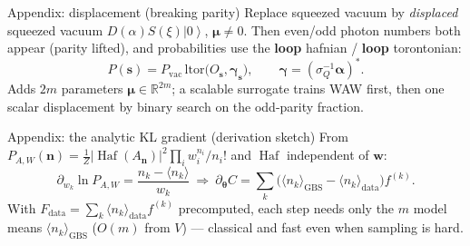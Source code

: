 \documentclass[10pt,aspectratio=169]{beamer}
\providecommand{\ket}[1]{\left|#1\right\rangle}
\newcommand{\Haf}{\operatorname{Haf}}
\newcommand{\vs}{\mathbf{s}}
\newcommand{\vn}{\mathbf{n}}
\begin{document}
\begin{frame}{Appendix: displacement (breaking parity)}
Replace squeezed vacuum by \emph{displaced} squeezed vacuum $D(\alpha)S(\xi)\ket0$,
$\bm\mu\neq0$. Then even/odd photon numbers both appear (parity lifted), and
probabilities use the \textbf{loop} hafnian / \textbf{loop} torontonian:
\[
P(\vs)=P_{\mathrm{vac}}\,\mathrm{ltor}\!\big(O_{\vs},\bm\gamma_{\vs}\big),\qquad
\bm\gamma=(\sigma_Q^{-1}\bm\alpha)^\ast .
\]
Adds $2m$ parameters $\bm\mu\in\mathbb R^{2m}$; a scalable surrogate trains WAW
first, then one scalar displacement by binary search on the odd-parity fraction.
\end{frame}

\begin{frame}{Appendix: the analytic KL gradient (derivation sketch)}
From $P_{A,W}(\vn)=\tfrac1Z|\Haf(A_{\vn})|^2\prod_i w_i^{n_i}/n_i!$ and
$\Haf$ independent of $\bm w$:
\[
\partial_{w_k}\ln P_{A,W}=\frac{n_k-\langle n_k\rangle}{w_k}
\ \Rightarrow\
\partial_{\bm\theta}C=\sum_k\big(\langle n_k\rangle_{\mathrm{GBS}}-\langle n_k\rangle_{\mathrm{data}}\big)f^{(k)} .
\]
With $F_{\mathrm{data}}=\sum_k\langle n_k\rangle_{\mathrm{data}}f^{(k)}$ precomputed,
each step needs only the $m$ model means $\langle n_k\rangle_{\mathrm{GBS}}$
($O(m)$ from $V$) --- classical and fast even when sampling is hard.
\end{frame}
\end{document}
